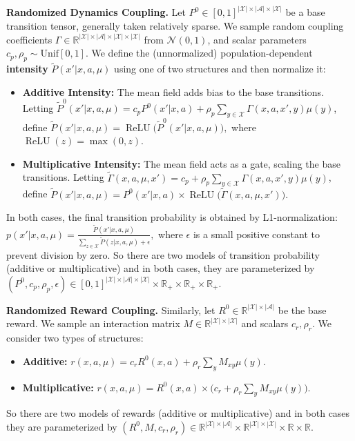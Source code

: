 \documentclass[10pt,twocolumn,letterpaper]{article}
\theoremstyle{definition}
\theoremstyle{remark}
\newcommand{\states}{\mathcal{X}}
\newcommand{\actions}{\mathcal{A}}
\newcommand{\unif}{\mathrm{Unif}}
\begin{document}
\noindent\textbf{Randomized Dynamics Coupling.} 
Let $P^0 \in [0,1]^{|\states| \times |\actions| \times |\states|}$ be a base transition tensor, generally taken relatively sparse. We sample random coupling coefficients $\Gamma \in \mathbb{R}^{|\states| \times |\actions| \times |\states| \times |\states|}$ from $\mathcal{N}(0, 1)$, and scalar parameters $c_p, \rho_p \sim \unif[0, 1]$. 
We define the (unnormalized) population-dependent \textbf{intensity} $\tilde{P}(x'|x, a, \mu)$ using one of two structures and then normalize it:
\begin{itemize}
    \item \noindent\textbf{Additive Intensity:}
The mean field adds bias to the base transitions. Letting $\tilde P^0(x'|x,a,\mu) = c_p P^0(x'|x,a) + \rho_p \sum_{y \in \states} \Gamma(x, a, x', y) \mu(y)$, define
\(
    \tilde{P}(x'|x, a, \mu) = \operatorname{ReLU}\big( \tilde P^0(x'|x,a,\mu) \big),
\)
where $\operatorname{ReLU}(z) = \max(0, z)$. 


\item \noindent\textbf{Multiplicative Intensity:}
The mean field acts as a gate, scaling the base transitions. Letting $\tilde \Gamma(x,a,\mu,x') = c_p + \rho_p \sum_{y \in \states} \Gamma(x, a, x', y) \mu(y)$, define
\(
    \tilde{P}(x'|x, a, \mu) = P^0(x'|x,a) \times \operatorname{ReLU}\big( \tilde \Gamma(x,a,\mu,x')\big).
\)
\end{itemize}
In both cases, the final transition probability is obtained by L1-normalization:
\(
    p(x'|x, a, \mu) = \frac{\tilde{P}(x'|x, a, \mu)}{\sum_{z \in \states} \tilde{P}(z|x, a, \mu) + \epsilon},
\)
where $\epsilon$ is a small positive constant to prevent division by zero. So there are two models of transition probability (additive or multiplicative) and in both cases, they are parameterized by $(P^0, c_p, \rho_p, \epsilon) \in [0,1]^{|\states| \times |\actions| \times |\states|} \times \mathbb{R}_+ \times \mathbb{R}_+ \times \mathbb{R}_+$.

\noindent\textbf{Randomized Reward Coupling.}
Similarly, let $R^0 \in \mathbb{R}^{|\states| \times |\actions|}$ be the base reward. We sample an interaction matrix $M \in \mathbb{R}^{|\states| \times |\states|}$ and scalars $c_r, \rho_r$. We consider two types of structures:
\begin{itemize}
    \item \textbf{Additive:}
    \(
        r(x, a, \mu) = c_r R^0(x, a) + \rho_r \sum_{y} M_{xy} \mu(y).
    \)

    \item \textbf{Multiplicative:}
    \(
        r(x, a, \mu) = R^0(x, a) \times \big( c_r + \rho_r \sum_{y} M_{xy} \mu(y) \big).
    \)
\end{itemize}
So there are two models of rewards (additive or multiplicative) and in both cases they are parameterized by $(R^0, M, c_r, \rho_r) \in \mathbb{R}^{|\states| \times |\actions|} \times \mathbb{R}^{|\states| \times |\states|} \times \mathbb{R} \times \mathbb{R}$.
\end{document}
